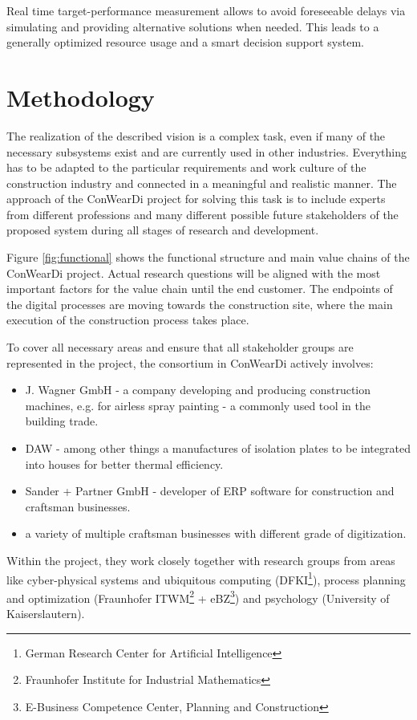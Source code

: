 Real time target-performance measurement allows to avoid foreseeable delays via simulating and providing alternative solutions when needed. This leads to a generally optimized resource usage and a smart decision support system.


\section{Methodology}
The realization of the described vision is a complex task, even if many of the necessary subsystems exist and are currently used in other industries. 
Everything has to be adapted to the particular requirements and work culture of the construction industry and connected in a meaningful and realistic manner. 
The approach of the ConWearDi project for solving this task is to include experts from different professions and many different possible future stakeholders of the proposed system during all stages of research and development.
 
Figure \ref{fig:functional} shows the functional structure and main value chains of the ConWearDi project. Actual research questions will be aligned with the most important factors for the value chain until the end customer. 
The endpoints of the digital processes are moving towards the construction site, where the main execution of the construction process takes place.

To cover all necessary areas and ensure that all stakeholder groups are represented in the project, the consortium in ConWearDi actively involves:
\begin{itemize}
  \item J. Wagner GmbH - a company developing and producing construction machines, e.g. for airless spray painting - a commonly used tool in the building trade.
  \item DAW - among other things a manufactures of isolation plates to be integrated into houses for better thermal efficiency.
  \item Sander + Partner GmbH - developer of ERP software for construction and craftsman businesses.
  \item a variety of multiple craftsman businesses with different grade of digitization.
\end{itemize}
Within the project, they work closely together with research groups from areas like cyber-physical systems and ubiquitous computing (DFKI\footnote{German Research Center for Artificial Intelligence}), process planning and optimization (Fraunhofer ITWM\footnote{Fraunhofer Institute for Industrial Mathematics} + eBZ\footnote{E-Business Competence Center, Planning and Construction}) and psychology (University of Kaiserslautern).

